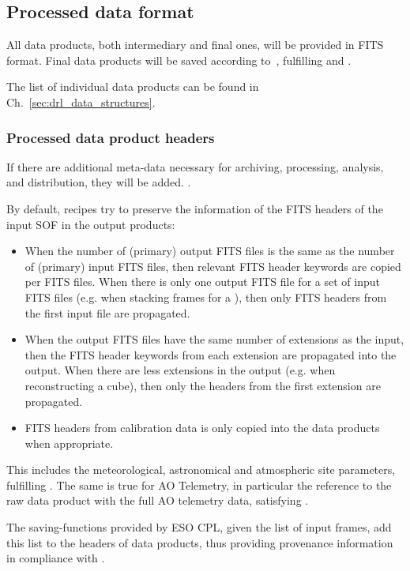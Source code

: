 \subsection{Processed data format}
\label{ssec:reduced_data_format}

All data products, both intermediary and final ones, will be provided in FITS format. Final data products will be saved according to~\cite{ESO-products_standard}, fulfilling  and .

The list of individual data products can be found in
Ch.~\ref{sec:drl_data_structures}.

\subsubsection{Processed data product headers}
\label{sssec:processeddataheaders}
If there are additional meta-data necessary for archiving, processing, analysis, and distribution, they will be added. .

By default, recipes try to preserve the information of the FITS headers of the input \ac{SOF} in the output products:
\begin{itemize}
\item When the number of (primary) output FITS files is the same as the number of (primary) input FITS files, then relevant FITS header keywords are copied per FITS files. When there is only one output FITS file for a set of input FITS files (e.g. when stacking frames for a ), then only FITS headers from the first input file are propagated.
\item When the output FITS files have the same number of extensions as  the input, then the FITS header keywords from each extension are propagated into the output. When there are less extensions in the output (e.g. when reconstructing a cube), then only the headers from the first extension are propagated.
\item FITS headers from calibration data is only copied into the data products when appropriate.
\end{itemize}
This includes the meteorological, astronomical and atmospheric site parameters, fulfilling .
The same is true for \ac{AO} Telemetry, in particular the reference to the raw data product with the full \ac{AO} telemetry data, satisfying .

The saving-functions provided by ESO \ac{CPL}, given the list of input frames, add this list to the headers of data products, thus providing provenance information in compliance with .

